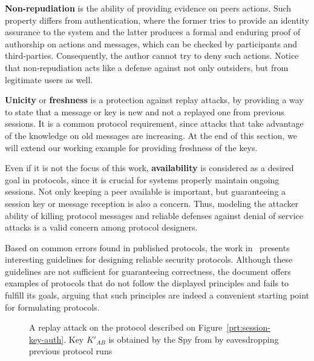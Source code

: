 \textbf{Non-repudiation} is the ability of providing evidence on peers actions. Such property differs from authentication, where the former tries to provide an identity assurance to the system and the latter produces a formal and enduring proof of authorship on actions and messages, which can be checked by participants and third-parties. Consequently, the author cannot try to deny such actions. Notice that non-repudiation acts like a defense against not only outsiders, but from legitimate users as well.

\textbf{Unicity} or \textbf{freshness} is a protection against replay attacks, by providing a way to state that a message or key is new and not a replayed one from previous sessions. It is a common protocol requirement, since attacks that take advantage of the knowledge on old messages are increasing. At the end of this section, we will extend our working example for providing freshness of the keys.

Even if it is not the focus of this work, \textbf{availability} is considered as a desired goal in protocols, since it is crucial for systems properly maintain ongoing sessions. Not only keeping a peer available is important, but guaranteeing a session key or message reception is also a concern. Thus, modeling the attacker ability of killing protocol messages and reliable defenses against denial of service attacks is a valid concern among protocol designers.

Based on common errors found in published protocols, the work in~\cite{AbadiNeedham96} presents interesting guidelines for designing reliable security protocols. Although these guidelines are not sufficient for guaranteeing correctness, the document offers examples of protocols that do not follow the displayed principles and fails to fulfill its goals, arguing that such principles are indeed a convenient starting point for formulating protocols.

\begin{figure}[!ht]\label{fig:attack-ex-replay}
  \centering

  \caption{A replay attack on the protocol described on Figure~\ref{prt:session-key-auth}. Key \(K'_{AB}\) is obtained by the Spy from by eavesdropping previous protocol runs}
\end{figure}

